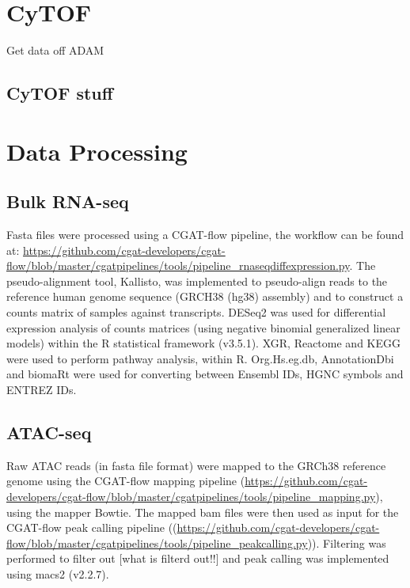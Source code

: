 \section{CyTOF}
Get data off ADAM
\subsection{CyTOF stuff}


\section{Data Processing}\label{sec:data_processing}
\subsection{Bulk RNA-seq}
Fasta files were processed using a CGAT-flow\cite{sims2014cgat} pipeline, the workflow can be found at: \url{https://github.com/cgat-developers/cgat-flow/blob/master/cgatpipelines/tools/pipeline_rnaseqdiffexpression.py}.
The pseudo-alignment tool, Kallisto\cite{bray2016near}, was implemented to pseudo-align reads to the reference human genome sequence (GRCH38 (hg38) assembly) and to construct a counts matrix of samples against transcripts.
DESeq2\cite{love2014moderated} was used for differential expression analysis of  counts  matrices  (using  negative  binomial  generalized  linear  models) within the R statistical framework (v3.5.1).
XGR\cite{fang2016xgr}, Reactome\cite{fabregat2017reactome} and KEGG\cite{kanehisa2017kegg} were used to perform pathway analysis, within R\@.
Org.Hs.eg.db\cite{carlson2019org}, AnnotationDbi\cite{pages2020annotationdbi} and biomaRt\cite{durinck2009mapping} were used for converting between Ensembl IDs, HGNC symbols and ENTREZ IDs.

\subsection{ATAC-seq}
Raw ATAC reads (in fasta file format) were mapped to the GRCh38 reference genome using the CGAT-flow mapping pipeline (\url{https://github.com/cgat-developers/cgat-flow/blob/master/cgatpipelines/tools/pipeline_mapping.py}), using the mapper Bowtie.
The mapped bam files were then used as input for the CGAT-flow peak calling pipeline ((\url{https://github.com/cgat-developers/cgat-flow/blob/master/cgatpipelines/tools/pipeline_peakcalling.py})).
Filtering was performed to filter out [what is filterd out!!] and peak calling was implemented using macs2 (v2.2.7)\cite{zhang2008model}.


